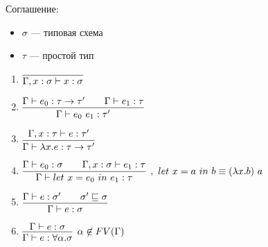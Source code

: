 Соглашение:
\begin{itemize}
    \item $\sigma$ --- типовая схема
    \item $\tau$ --- простой тип
\end{itemize}


\begin{enumerate}
    \item $\vcenter{\infer{\Gamma, x : \sigma \vdash x : \sigma}{}}$
    \item $\vcenter{\infer{\Gamma \vdash e_0\ e_1 : \tau'}{\Gamma \vdash e_0 : \tau \rightarrow \tau' \qquad \Gamma \vdash e_1 : \tau}}$
    \item $\vcenter{\infer{\Gamma \vdash \lambda x.e : \tau \rightarrow \tau'}{\Gamma, x : \tau \vdash e : \tau'}}$
    \item $\vcenter{\infer[,\ let\ x = a\ in\ b \equiv (\lambda x.b)\ a]{\Gamma \vdash let\ x = e_0\ in\ e_1 : \tau}{\Gamma \vdash e_0 : \sigma \qquad \Gamma, x : \sigma \vdash e_1 : \tau}}$ 
    \item $\vcenter{\infer{\Gamma \vdash e : \sigma}{\Gamma \vdash e : \sigma' \qquad  \sigma' \sqsubseteq \sigma}}$
    \item $\vcenter{\infer[\alpha \not \in FV(\Gamma)]{\Gamma \vdash e : \forall \alpha.\sigma}{\Gamma \vdash e : \sigma}}$
\end{enumerate}


